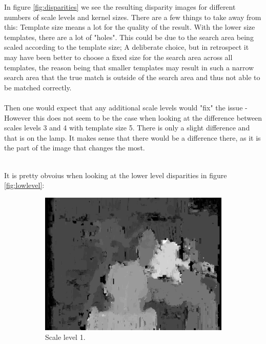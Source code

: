 \documentclass[12pt,a4paper,oneside,final]{article}
\begin{document}
\begin{table}[H]
\begin{subtable}{1\textwidth}
	In figure \ref{fig:disparities} we see the resulting disparity images for different numbers of scale levels and kernel sizes. There are a few things to take away from this: Template size means a lot for the quality of the result. With the lower size templates, there are a lot of "holes". This could be due to the search area being scaled according to the template size; A deliberate choice, but in retrospect it may have been better to choose a fixed size for the search area across all templates, the reason being that smaller templates may result in such a narrow search area that the true match is outside of the search area and thus not able to be matched correctly.\\\\
	Then one would expect that any additional scale levels would "fix" the issue - However this does not seem to be the case when looking at the difference between scales levels 3 and 4 with template size 5. There is only a slight difference and that is on the lamp. It makes sense that there would be a difference there, as it is the part of the image that changes the most.\\\\
	\iffalse
	{\color{red} It is pretty obvoius when looking at the lower level disparities in figure \ref{fig:lowlevel}:
		\begin{figure}[H]
			\centering
			\begin{subfigure}[b]{0.24\textwidth}
				\includegraphics[width=\textwidth]{disparity1set_1.png}
				\caption{Scale level 1.}
			\end{subfigure}
			\begin{subfigure}[b]{0.24\textwidth}

\end{subfigure}
\end{figure}}
\end{subtable}
\end{table}
\end{document}

